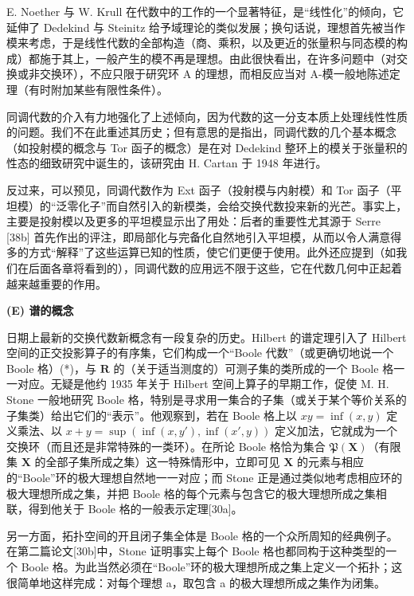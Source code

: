 E. Noether 与 W. Krull 在代数中的工作的一个显著特征，是“线性化”的倾向，它延伸了 Dedekind 与 Steinitz 给予域理论的类似发展；换句话说，理想首先被当作模来考虑，于是线性代数的全部构造（商、乘积，以及更近的张量积与同态模的构成）都施于其上，一般产生的模不再是理想。由此很快看出，在许多问题中（对交换或非交换环），不应只限于研究环 A 的理想，而相反应当对 A-模一般地陈述定理（有时附加某些有限性条件）。

同调代数的介入有力地强化了上述倾向，因为代数的这一分支本质上处理线性性质的问题。我们不在此重述其历史；但有意思的是指出，同调代数的几个基本概念（如投射模的概念与 Tor 函子的概念）是在对 Dedekind 整环上的模关于张量积的性态的细致研究中诞生的，该研究由 H. Cartan 于 1948 年进行。

反过来，可以预见，同调代数作为 Ext 函子（投射模与内射模）和 Tor 函子（平坦模）的“泛零化子”而自然引入的新模类，会给交换代数投来新的光芒。事实上，主要是投射模以及更多的平坦模显示出了用处：后者的重要性尤其源于 Serre {[}38b{]} 首先作出的评注，即局部化与完备化自然地引入平坦模，从而以令人满意得多的方式“解释”了这些运算已知的性质，使它们更便于使用。此外还应提到（如我们在后面各章将看到的），同调代数的应用远不限于这些，它在代数几何中正起着越来越重要的作用。

\textbf{(E) 谱的概念}\par

日期上最新的交换代数新概念有一段复杂的历史。Hilbert 的谱定理引入了 Hilbert 空间的正交投影算子的有序集，它们构成一个“Boole 代数”（或更确切地说一个 Boole 格）(*)，与 \(\mathbf{R}\) 的（关于适当测度的）可测子集的类所成的一个 Boole 格一一对应。无疑是他约 1935 年关于 Hilbert 空间上算子的早期工作，促使 M. H. Stone 一般地研究 Boole 格，特别是寻求用一集合的子集（或关于某个等价关系的子集类）给出它们的“表示”。他观察到，若在 Boole 格上以 \(xy = \inf(x, y)\) 定义乘法、以 \(x + y = \sup(\inf(x, y'), \inf(x', y))\) 定义加法，它就成为一个交换环（而且还是非常特殊的一类环）。在所论 Boole 格恰为集合 \(\mathfrak{P}(\mathbf{X})\)（有限集 \(\mathbf{X}\) 的全部子集所成之集）这一特殊情形中，立即可见 \(\mathbf{X}\) 的元素与相应的“Boole”环的极大理想自然地一一对应；而 Stone 正是通过类似地考虑相应环的极大理想所成之集，并把 Boole 格的每个元素与包含它的极大理想所成之集相联，得到他关于 Boole 格的一般表示定理{[}30a{]}。

另一方面，拓扑空间的开且闭子集全体是 Boole 格的一个众所周知的经典例子。在第二篇论文{[}30b{]}中，Stone 证明事实上每个 Boole 格也都同构于这种类型的一个 Boole 格。为此当然必须在“Boole”环的极大理想所成之集上定义一个拓扑；这很简单地这样完成：对每个理想 a，取包含 a 的极大理想所成之集作为闭集。

